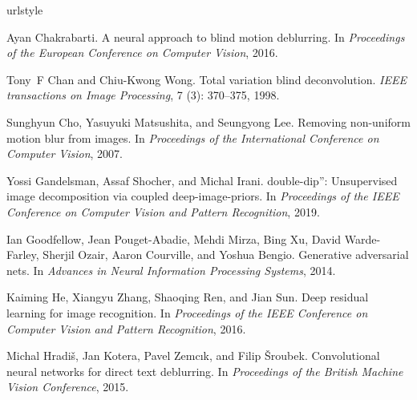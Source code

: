 \documentclass[final]{cvpr}
\begin{document}
{\small
%
\setlength{\bibsep}{0pt}
\begin{thebibliography}{43}
\providecommand{\natexlab}[1]{#1}
\providecommand{\url}[1]{\texttt{#1}}
\expandafter\ifx\csname urlstyle\endcsname\relax
  \providecommand{\doi}[1]{doi: #1}\else
  \providecommand{\doi}{doi: \begingroup \urlstyle{rm}\Url}\fi

Ayan Chakrabarti.
\newblock A neural approach to blind motion deblurring.
\newblock In \emph{Proceedings of the European Conference on Computer Vision},
  2016.

Tony~F Chan and Chiu-Kwong Wong.
\newblock Total variation blind deconvolution.
\newblock \emph{IEEE transactions on Image Processing}, 7
  (3): 370--375, 1998.

Sunghyun Cho, Yasuyuki Matsushita, and Seungyong Lee.
\newblock Removing non-uniform motion blur from images.
\newblock In \emph{Proceedings of the International Conference on Computer
  Vision}, 2007.

Yossi Gandelsman, Assaf Shocher, and Michal Irani.
\newblock double-dip”: Unsupervised image decomposition via coupled
  deep-image-priors.
\newblock In \emph{Proceedings of the {IEEE} Conference on Computer Vision and
  Pattern Recognition}, 2019.

Ian Goodfellow, Jean Pouget-Abadie, Mehdi Mirza, Bing Xu, David Warde-Farley,
  Sherjil Ozair, Aaron Courville, and Yoshua Bengio.
\newblock Generative adversarial nets.
\newblock In \emph{Advances in Neural Information Processing Systems}, 2014.

Kaiming He, Xiangyu Zhang, Shaoqing Ren, and Jian Sun.
\newblock Deep residual learning for image recognition.
\newblock In \emph{Proceedings of the {IEEE} Conference on Computer Vision and
  Pattern Recognition}, 2016.

Michal Hradi{\v{s}}, Jan Kotera, Pavel Zemc{\i}k, and Filip {\v{S}}roubek.
\newblock Convolutional neural networks for direct text deblurring.
\newblock In \emph{Proceedings of the British Machine Vision Conference}, 2015.


\end{thebibliography}}
\end{document}
